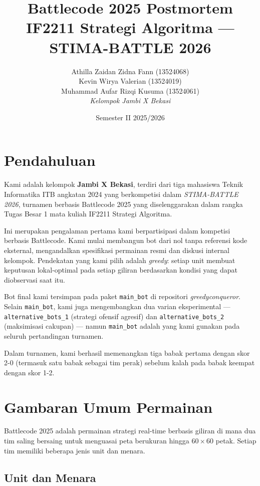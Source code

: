 \documentclass[12pt, a4paper]{article}
\title{
    \textbf{Battlecode 2025 Postmortem} \\[0.4cm]
    \large IF2211 Strategi Algoritma --- STIMA-BATTLE 2026
}
\author{
    Athilla Zaidan Zidna Fann (13524068) \\
    Kevin Wirya Valerian (13524019) \\
    Muhammad Aufar Rizqi Kusuma (13524061) \\[0.2cm]
    \textit{Kelompok Jambi X Bekasi}
}
\date{Semester II 2025/2026}
\begin{document}
\maketitle
\tableofcontents
\newpage

\section{Pendahuluan}

Kami adalah kelompok \textbf{Jambi X Bekasi}, terdiri dari tiga mahasiswa Teknik
Informatika ITB angkatan 2024 yang berkompetisi dalam \textit{STIMA-BATTLE 2026},
turnamen berbasis Battlecode 2025 yang diselenggarakan dalam rangka Tugas Besar 1
mata kuliah IF2211 Strategi Algoritma.

Ini merupakan pengalaman pertama kami berpartisipasi dalam kompetisi berbasis
Battlecode. Kami mulai membangun bot dari nol tanpa referensi kode eksternal,
mengandalkan spesifikasi permainan resmi dan diskusi internal kelompok. Pendekatan
yang kami pilih adalah \textit{greedy}: setiap unit membuat keputusan lokal-optimal
pada setiap giliran berdasarkan kondisi yang dapat diobservasi saat itu.

Bot final kami tersimpan pada paket \texttt{main\_bot} di repositori
\textit{greedy\-conqueror}. Selain \texttt{main\_bot}, kami juga mengembangkan dua
varian eksperimental --- \texttt{alternative\_\allowbreak bots\_1} (strategi ofensif
agresif) dan \texttt{alternative\_\allowbreak bots\_2} (maksimisasi cakupan) ---
namun \texttt{main\_bot} adalah yang kami gunakan pada seluruh pertandingan turnamen.

Dalam turnamen, kami berhasil memenangkan tiga babak pertama dengan skor 2-0
(termasuk satu babak sebagai tim perak) sebelum kalah pada babak keempat dengan
skor 1-2.

\section{Gambaran Umum Permainan}

Battlecode 2025 adalah permainan strategi real-time berbasis giliran di mana dua
tim saling bersaing untuk menguasai peta berukuran hingga $60 \times 60$ petak.
Setiap tim memiliki beberapa jenis unit dan menara.

\subsection*{Unit dan Menara}
\end{document}
